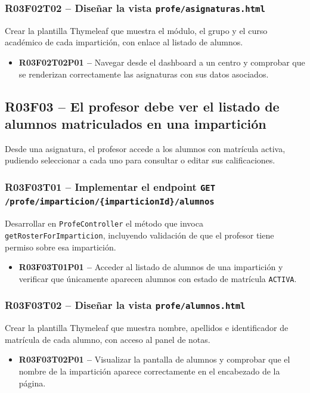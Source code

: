 \documentclass[12pt, a4paper]{report}
\begin{document}
\subsubsection{R03F02T02 -- Diseñar la vista \texttt{profe/asignaturas.html}}
Crear la plantilla Thymeleaf que muestra el módulo, el grupo y el curso académico de cada impartición, con enlace al listado de alumnos.
\begin{itemize}
  \item \textbf{R03F02T02P01 --} Navegar desde el dashboard a un centro y comprobar que se renderizan correctamente las asignaturas con sus datos asociados.
\end{itemize}

\subsection{R03F03 -- El profesor debe ver el listado de alumnos matriculados en una impartición}

Desde una asignatura, el profesor accede a los alumnos con matrícula activa, pudiendo seleccionar a cada uno para consultar o editar sus calificaciones.

\subsubsection{R03F03T01 -- Implementar el endpoint \texttt{GET /profe/imparticion/\{imparticionId\}/alumnos}}
Desarrollar en \texttt{ProfeController} el método que invoca \texttt{getRosterForImparticion}, incluyendo validación de que el profesor tiene permiso sobre esa impartición.
\begin{itemize}
  \item \textbf{R03F03T01P01 --} Acceder al listado de alumnos de una impartición y verificar que únicamente aparecen alumnos con estado de matrícula \texttt{ACTIVA}.
\end{itemize}

\subsubsection{R03F03T02 -- Diseñar la vista \texttt{profe/alumnos.html}}
Crear la plantilla Thymeleaf que muestra nombre, apellidos e identificador de matrícula de cada alumno, con acceso al panel de notas.
\begin{itemize}
  \item \textbf{R03F03T02P01 --} Visualizar la pantalla de alumnos y comprobar que el nombre de la impartición aparece correctamente en el encabezado de la página.
\end{itemize}
\end{document}
